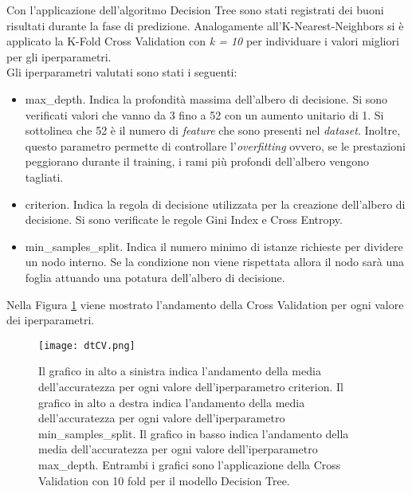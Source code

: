 Con l'applicazione dell'algoritmo Decision Tree sono stati registrati dei buoni risultati durante la fase di predizione. Analogamente all'K-Nearest-Neighbors si è applicato la K-Fold Cross Validation con \emph{k = 10} per individuare i valori migliori per gli iperparametri.\\
Gli iperparametri valutati sono stati i seguenti:
\begin{itemize}
	\item \textsf{max\_depth}. Indica la profondità massima dell'albero di decisione. Si sono verificati valori che vanno da 3 fino a 52 con un aumento unitario di 1. Si sottolinea che 52 è il numero di \emph{feature} che sono presenti nel \emph{dataset}. Inoltre, questo parametro permette di controllare l'\emph{overfitting} ovvero, se le prestazioni peggiorano durante il training, i rami più profondi dell'albero vengono tagliati.
	\item \textsf{criterion}. Indica la regola di decisione utilizzata per la creazione dell'albero di decisione. Si sono verificate le regole Gini Index e Cross Entropy.
	\item \textsf{min\_samples\_split}. Indica il numero minimo di istanze richieste per dividere un nodo interno. Se la condizione non viene rispettata allora il nodo sarà una foglia attuando una potatura dell'albero di decisione.
\end{itemize}

Nella Figura \ref{fig:dtCV}  viene mostrato l'andamento della Cross Validation per ogni valore dei iperparametri.
\begin{figure}[h]
	\begin{center}
		\texttt{[image: dtCV.png]}
		\caption{Il grafico in alto a sinistra indica l'andamento della media dell'accuratezza per ogni valore dell'iperparametro \textsf{criterion}. Il grafico in alto a destra indica l'andamento della media dell'accuratezza per ogni valore dell'iperparametro \textsf{min\_samples\_split}. Il grafico in basso indica l'andamento della media dell'accuratezza per ogni valore dell'iperparametro \textsf{max\_depth}. Entrambi i grafici sono l'applicazione della Cross Validation con 10 fold per il modello Decision Tree. 
		} 
		\label{fig:dtCV}
	\end{center}
\end{figure}

